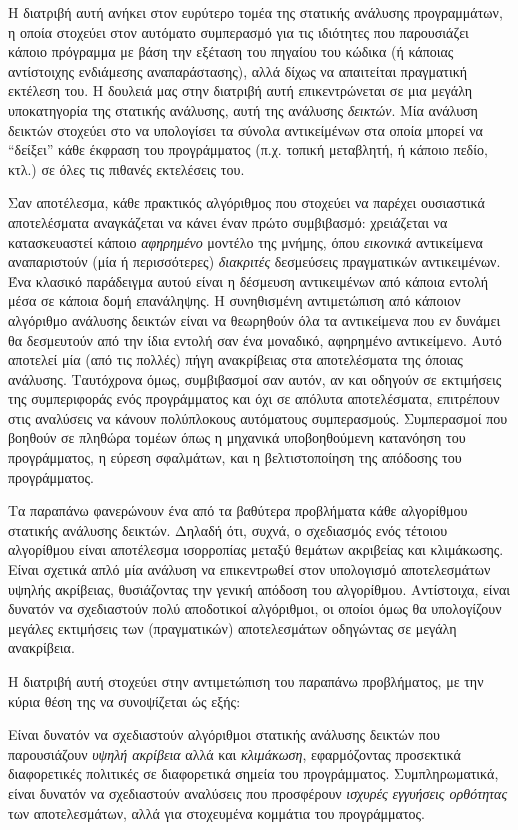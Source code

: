 Η διατριβή αυτή ανήκει στον ευρύτερο τομέα της στατικής ανάλυσης προγραμμάτων, η οποία στοχεύει στον αυτόματο συμπερασμό για τις ιδιότητες που παρουσιάζει κάποιο πρόγραμμα με βάση την εξέταση του πηγαίου του κώδικα (ή κάποιας αντίστοιχης ενδιάμεσης αναπαράστασης), αλλά δίχως να απαιτείται πραγματική εκτέλεση του. Η δουλειά μας στην διατριβή αυτή επικεντρώνεται σε μια μεγάλη υποκατηγορία της στατικής ανάλυσης, αυτή της ανάλυσης \emph{δεικτών}. Μία ανάλυση δεικτών στοχεύει στο να υπολογίσει τα σύνολα αντικείμένων στα οποία μπορεί να ``δείξει'' κάθε έκφραση του προγράμματος (π.χ. τοπική μεταβλητή, ή κάποιο πεδίο, κτλ.) σε όλες τις πιθανές εκτελέσεις του.

Σαν αποτέλεσμα, κάθε πρακτικός αλγόριθμος που στοχεύει να παρέχει ουσιαστικά αποτελέσματα αναγκάζεται να κάνει έναν πρώτο συμβιβασμό: χρειάζεται να κατασκευαστεί κάποιο \emph{αφηρημένο} μοντέλο της μνήμης, όπου \emph{εικονικά} αντικείμενα αναπαριστούν (μία ή περισσότερες) \emph{διακριτές} δεσμεύσεις πραγματικών αντικειμένων. Ένα κλασικό παράδειγμα αυτού είναι η δέσμευση αντικειμένων από κάποια εντολή μέσα σε κάποια δομή επανάληψης. Η συνηθισμένη αντιμετώπιση από κάποιον αλγόριθμο ανάλυσης δεικτών είναι να θεωρηθούν όλα τα αντικείμενα που εν δυνάμει θα δεσμευτούν από την ίδια εντολή σαν ένα μοναδικό, αφηρημένο αντικείμενο. Αυτό αποτελεί μία (από τις πολλές) πήγη ανακρίβειας στα αποτελέσματα της όποιας ανάλυσης. Ταυτόχρονα όμως, συμβιβασμοί σαν αυτόν, αν και οδηγούν σε εκτιμήσεις της συμπεριφοράς ενός προγράμματος και όχι σε απόλυτα αποτελέσματα, επιτρέπουν στις αναλύσεις να κάνουν πολύπλοκους αυτόματους συμπερασμούς. Συμπερασμοί που βοηθούν σε πληθώρα τομέων όπως η μηχανικά υποβοηθούμενη κατανόηση του προγράμματος, η εύρεση σφαλμάτων, και η βελτιστοποίηση της απόδοσης του προγράμματος.

Τα παραπάνω φανερώνουν ένα από τα βαθύτερα προβλήματα κάθε αλγορίθμου στατικής ανάλυσης δεικτών. Δηλαδή ότι, συχνά, ο σχεδιασμός ενός τέτοιου αλγορίθμου είναι αποτέλεσμα ισορροπίας μεταξύ θεμάτων ακριβείας και κλιμάκωσης. Είναι σχετικά απλό μία ανάλυση να επικεντρωθεί στον υπολογισμό αποτελεσμάτων υψηλής ακρίβειας, θυσιάζοντας την γενική απόδοση του αλγορίθμου. Αντίστοιχα, είναι δυνατόν να σχεδιαστούν πολύ αποδοτικοί αλγόριθμοι, οι οποίοι όμως θα υπολογίζουν μεγάλες εκτιμήσεις των (πραγματικών) αποτελεσμάτων οδηγώντας σε μεγάλη ανακρίβεια.

Η διατριβή αυτή στοχεύει στην αντιμετώπιση του παραπάνω προβλήματος, με την κύρια θέση της να συνοψίζεται ώς εξής:

\begin{displayquote}
Είναι δυνατόν να σχεδιαστούν αλγόριθμοι στατικής ανάλυσης δεικτών που παρουσιάζουν \emph{υψηλή ακρίβεια} αλλά και \emph{κλιμάκωση}, εφαρμόζοντας προσεκτικά διαφορετικές πολιτικές σε διαφορετικά σημεία του προγράμματος. Συμπληρωματικά, είναι δυνατόν να σχεδιαστούν αναλύσεις που προσφέρουν \emph{ισχυρές εγγυήσεις ορθότητας} των αποτελεσμάτων, αλλά για στοχευμένα κομμάτια του προγράμματος.
\end{displayquote}

